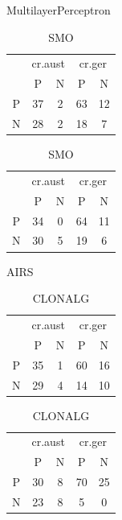 \begin{table}[p]
    \parbox{.45\linewidth}{
        \centering
        \caption{MultilayerPerceptron}
        \begin{tabular}{c|c c|c c}
            \multicolumn{1}{c}{}  & \multicolumn{2}{c}{cr.aust} & \multicolumn{2}{c}{cr.ger} \\
            \multirow{1}{2.5mm}{} & P & N & P & N \\
            \hline
            P & 37 & 2 & 63 & 12 \\
            N & 28 & 2 & 18 &  7 \\
        \end{tabular}
    }
    \hfill
    \parbox{.45\linewidth}{
        \centering
        \caption{SMO}
        \begin{tabular}{c|c c|c c}
            \multicolumn{1}{c}{}  & \multicolumn{2}{c}{cr.aust} & \multicolumn{2}{c}{cr.ger} \\
            \multirow{1}{2.5mm}{} & P & N & P & N \\
            \hline
            P & 34 & 0 & 64 & 11 \\
            N & 30 & 5 & 19 &  6 \\
        \end{tabular}
    }
\end{table}

\begin{table}[p]
    \parbox{.45\linewidth}{
        \centering
        \caption{AIRS}
        \begin{tabular}{c|c c|c c}
            \multicolumn{1}{c}{}  & \multicolumn{2}{c}{cr.aust} & \multicolumn{2}{c}{cr.ger} \\
            \multirow{1}{2.5mm}{} & P & N & P & N \\
            \hline
            P & 35 & 1 & 60 & 16 \\
            N & 29 & 4 & 14 & 10 \\
        \end{tabular}
    }
    \hfill
    \parbox{.45\linewidth}{
        \centering
        \caption{CLONALG}
        \begin{tabular}{c|c c|c c}
            \multicolumn{1}{c}{}  & \multicolumn{2}{c}{cr.aust} & \multicolumn{2}{c}{cr.ger} \\
            \multirow{1}{2.5mm}{} & P & N & P & N \\
            \hline
            P & 30 & 8 & 70 & 25 \\
            N & 23 & 8 &  5 &  0 \\
        \end{tabular}
    }
\end{table}

